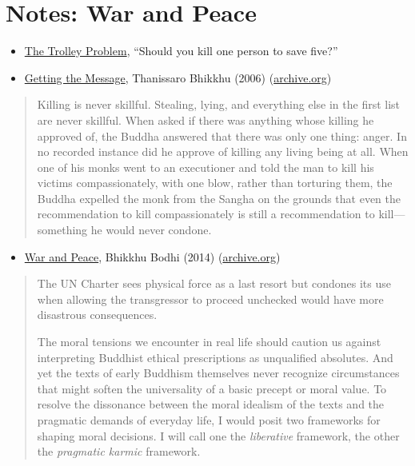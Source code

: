 \clearpage

\section{Notes: War and Peace}

\begin{itemize}
\item
  \href{https://en.wikipedia.org/wiki/Trolley_problem}{The Trolley
  Problem}, ``Should you kill one person to save five?''
\item
  \href{https://www.buddhistinquiry.org/article/getting-the-message/}{Getting
  the Message}, Thanissaro Bhikkhu (2006)
  (\href{https://web.archive.org/web/20201113023105/https://www.buddhistinquiry.org/article/getting-the-message/}{archive.org})
\end{itemize}

\begin{quote}
Killing is never skillful. Stealing, lying, and everything else in the
first list are never skillful. When asked if there was anything whose
killing he approved of, the Buddha answered that there was only one
thing: anger. In no recorded instance did he approve of killing any
living being at all. When one of his monks went to an executioner and
told the man to kill his victims compassionately, with one blow, rather
than torturing them, the Buddha expelled the monk from the Sangha on the
grounds that even the recommendation to kill compassionately is still a
recommendation to kill---something he would never condone.
\end{quote}

\begin{itemize}
\tightlist
\item
  \href{https://www.inquiringmind.com/article/3002_5_bhodi-war-and-peace-a-buddhist-perspective/}{War
  and Peace}, Bhikkhu Bodhi (2014)
  (\href{https://web.archive.org/web/20151122005139/http://www.inquiringmind.com/Articles/WarAndPeace.html}{archive.org})
\end{itemize}

\begin{quote}
The UN Charter sees physical force as a last resort but condones its use
when allowing the transgressor to proceed unchecked would have more
disastrous consequences.

The moral tensions we encounter in real life should caution us against
interpreting Buddhist ethical prescriptions as unqualified absolutes.
And yet the texts of early Buddhism themselves never recognize
circumstances that might soften the universality of a basic precept or
moral value. To resolve the dissonance between the moral idealism of the
texts and the pragmatic demands of everyday life, I would posit two
frameworks for shaping moral decisions. I will call one the
\emph{liberative} framework, the other the \emph{pragmatic karmic}
framework.
\end{quote}

